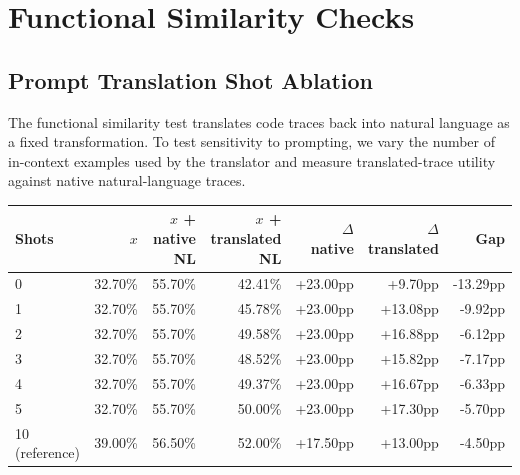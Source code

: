 
\section{Functional Similarity Checks}
\label{app:functional_similarity_checks}

\subsection{Prompt Translation Shot Ablation}
\label{app:prompt_translation_shot_ablation}

The functional similarity test translates code traces back into natural
language as a fixed transformation. To test sensitivity to prompting, we vary the number of
in-context examples used by the translator and measure translated-trace utility
against native natural-language traces.

\begin{appendixtableblock}
\small
\setlength{\tabcolsep}{4pt}
\begin{tabular*}{\linewidth}{@{\extracolsep{\fill}}lrrrrrr@{}}
\toprule
Shots & $x$ & $x$ + native NL & $x$ + translated NL & $\Delta$ native & $\Delta$ translated & Gap \\
\midrule
0 & 32.70\% & 55.70\% & 42.41\% & +23.00pp & +9.70pp & -13.29pp \\
1 & 32.70\% & 55.70\% & 45.78\% & +23.00pp & +13.08pp & -9.92pp \\
2 & 32.70\% & 55.70\% & 49.58\% & +23.00pp & +16.88pp & -6.12pp \\
3 & 32.70\% & 55.70\% & 48.52\% & +23.00pp & +15.82pp & -7.17pp \\
4 & 32.70\% & 55.70\% & 49.37\% & +23.00pp & +16.67pp & -6.33pp \\
5 & 32.70\% & 55.70\% & 50.00\% & +23.00pp & +17.30pp & -5.70pp \\
10 (reference) & 39.00\% & 56.50\% & 52.00\% & +17.50pp & +13.00pp & -4.50pp \\
\bottomrule
\end{tabular*}
\label{tab:appendix_shot_ablation}
\end{appendixtableblock}


